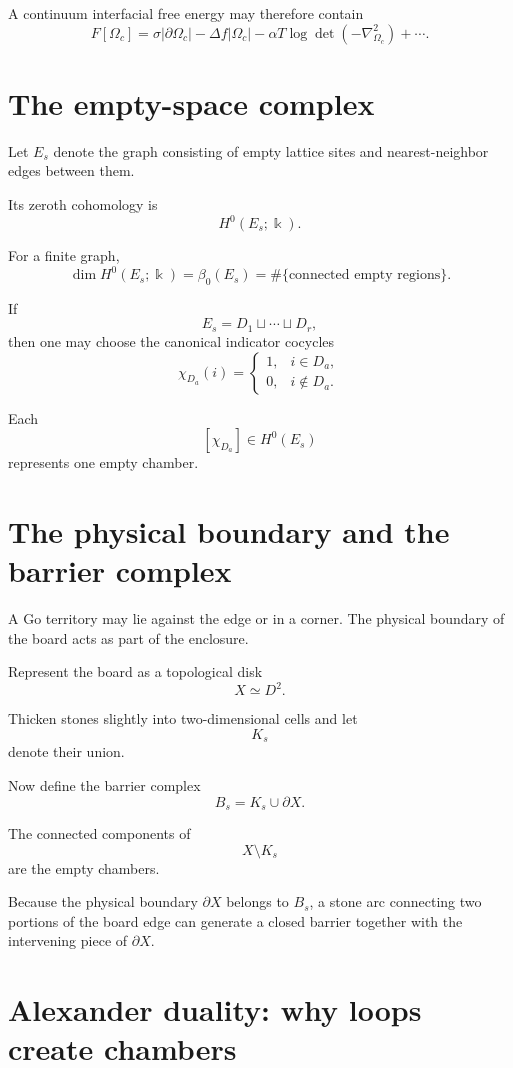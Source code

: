 \documentclass[11pt]{article}
\begin{document}
A continuum interfacial free energy may therefore contain
\[
F[\Omega_c]
=
\sigma|\partial\Omega_c|
-\Delta f|\Omega_c|
-\alpha T\log\det(-\nabla^2_{\Omega_c})
+\cdots.
\]

\section{The empty-space complex}

Let \(E_s\) denote the graph consisting of empty lattice sites and nearest-neighbor edges between them.

Its zeroth cohomology is
\[
H^0(E_s;\Bbbk).
\]

For a finite graph,
\[
\dim H^0(E_s;\Bbbk)
=
\beta_0(E_s)
=
\#\{\text{connected empty regions}\}.
\]

If
\[
E_s=D_1\sqcup\cdots\sqcup D_r,
\]
then one may choose the canonical indicator cocycles
\[
\chi_{D_a}(i)
=
\begin{cases}
1,&i\in D_a,\\
0,&i\notin D_a.
\end{cases}
\]

Each
\[
[\chi_{D_a}]\in H^0(E_s)
\]
represents one empty chamber.

\section{The physical boundary and the barrier complex}

A Go territory may lie against the edge or in a corner. The physical boundary of the board acts as part of the enclosure.

Represent the board as a topological disk
\[
X\simeq D^2.
\]

Thicken stones slightly into two-dimensional cells and let
\[
K_s
\]
denote their union.

Now define the barrier complex
\[
\boxed{
B_s=K_s\cup\partial X.
}
\]

The connected components of
\[
X\setminus K_s
\]
are the empty chambers.

Because the physical boundary \(\partial X\) belongs to \(B_s\), a stone arc connecting two portions of the board edge can generate a closed barrier together with the intervening piece of \(\partial X\).

\section{Alexander duality: why loops create chambers}
\end{document}
